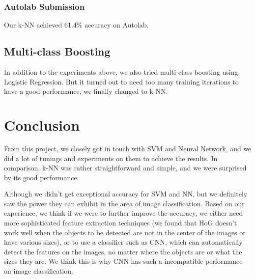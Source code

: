 \documentclass{article} %
\begin{document}
\subsubsection{Autolab Submission}
Our k-NN achieved 61.4\% accuracy on Autolab.

\subsection{Multi-class Boosting}
In addition to the experiments above, we also tried multi-class boosting using Logistic Regression. But it turned out to need too many training iterations to have a good performance, we finally changed to k-NN.


\section{Conclusion}
From this project, we closely got in touch with SVM and Neural Network, and we did a lot of tunings and experiments on them to achieve the results. In comparison, k-NN was rather straightforward and simple, and we were surprised by its good performance.

Although we didn't get exceptional accuracy for SVM and NN, but we definitely saw the power they can exhibit in the area of image classification. Based on our experience, we think if we were to further improve the accuracy, we either need more sophisticated feature extraction techniques (we found that HoG doesn't work well when the objects to be detected are not in the center of the images or have various sizes), or to use a classifier such as CNN, which can automatically detect the features on the images, no matter where the objects are or what the sizes they are. We think this is why CNN has such a incompatible performance on image classification.




\end{document}
